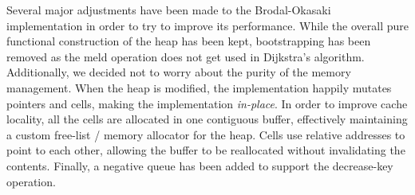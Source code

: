 Several major adjustments have been made to the Brodal-Okasaki implementation
in order to try to improve its performance. While the overall pure functional
construction of the heap has been kept, bootstrapping has been removed as the
meld operation does not get used in Dijkstra's algorithm. Additionally, we decided not to
worry about the purity of the memory management. When the heap is modified, the
implementation happily mutates pointers and cells, making the implementation
\emph{in-place}. In order to improve cache locality, all the cells are allocated in
one contiguous buffer, effectively maintaining a custom free-list / memory
allocator for the heap. Cells use relative addresses to point to each other,
allowing the buffer to be reallocated without invalidating the contents.
Finally, a negative queue has been added to support the decrease-key operation.
